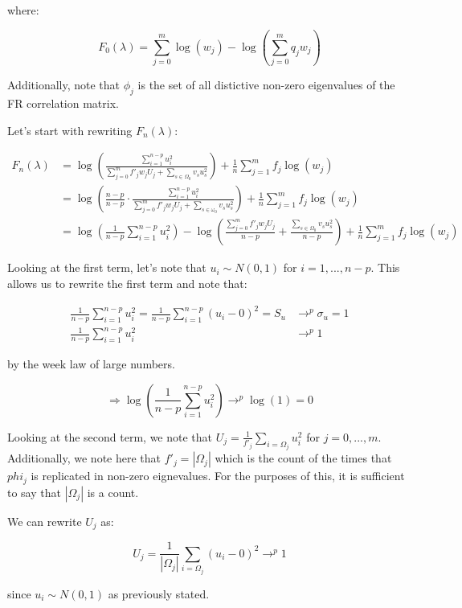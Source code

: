 \documentclass[
]{article}
\begin{document}
where:

\[
F_0(\lambda) = \sum_{j=0}^m \log(w_j) - \log\left(\sum_{j=0}^m q_j w_j\right)
\]

Additionally, note that \(\phi_j\) is the set of all distictive non-zero
eigenvalues of the FR correlation matrix.

Let's start with rewriting \(F_n(\lambda)\):

\[
\begin{split}
F_n(\lambda) & = \log \left( \frac{\sum_{i=1}^{n-p} u_i^2}{\sum_{j=0}^m f'_j w_j U_j + \sum_{s \in \Omega_0} v_s u_s^2} \right) + \frac{1}{n} \sum_{j=1}^m f_j \log (w_j) \\
& = \log \left(\frac{n-p}{n-p} \cdot \frac{\sum_{i=1}^{n-p} u_i^2}{\sum_{j=0}^m f'_j w_j U_j + \sum_{s \in \omega_0} v_s u_s^2} \right) + \frac{1}{n} \sum_{j=1}^m f_j \log (w_j) \\
& = \log\left( \frac{1}{n-p} \sum_{i=1}^{n-p} u_i^2 \right) - \log\left( \frac{\sum_{j=0}^m f'_j w_j U_j}{n-p} + \frac{\sum_{s \in \Omega_0}v_s u_s^2}{n-p}  \right) + \frac 1 n \sum_{j=1}^m f_j \log(w_j) 
\end{split}
\]

Looking at the first term, let's note that \(u_i \sim N(0,1)\) for
\(i = 1, ..., n-p\). This allows us to rewrite the first term and note
that:

\[
\begin{split}
\frac{1}{n-p} \sum_{i=1}^{n-p} u_i^2 = \frac{1}{n-p} \sum_{i=1}^{n-p} (u_i - 0)^2 = S_u  & \rightarrow^p \sigma_u = 1 \\
\frac{1}{n-p} \sum_{i=1}^{n-p} u_i^2 & \rightarrow^p 1
\end{split}
\]

by the week law of large numbers.

\[
\Rightarrow \log\left( \frac{1}{n-p} \sum_{i=1}^{n-p} u_i^2 \right) \rightarrow ^p \log(1) = 0
\]

Looking at the second term, we note that
\(U_j = \frac{1}{f'_j} \sum_{i = \Omega_j} u_i^2\) for
\(j = 0, ..., m\). Additionally, we note here that \(f'_j = |\Omega_j|\)
which is the count of the times that \(phi_j\) is replicated in non-zero
eignevalues. For the purposes of this, it is sufficient to say that
\(|\Omega_j|\) is a count.

We can rewrite \(U_j\) as:

\[
U_j = \frac{1}{|\Omega_j|} \sum_{i = \Omega_j} (u_i - 0)^2 \rightarrow^p 1
\]

since \(u_i \sim N(0,1)\) as previously stated.
\end{document}
